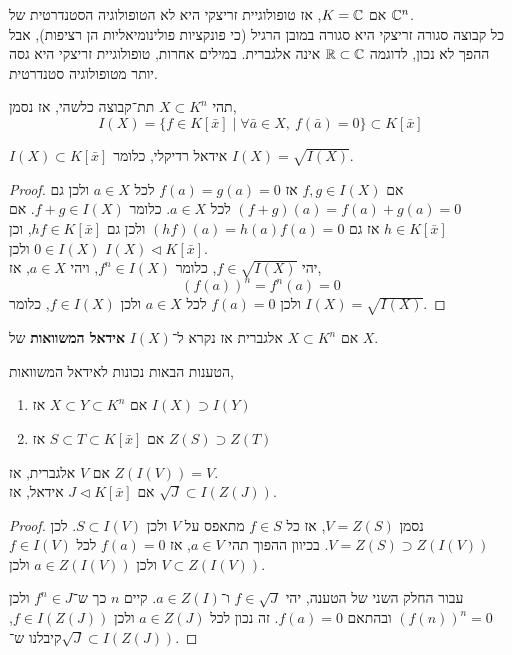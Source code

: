 \begin{remark}
	אם $K = \mathbb{C}$, אז טופולוגיית זריצקי היא לא הטופולוגיה הסטנדרטית של $\mathbb{C}^n$. \\
	כל קבוצה סגורה זריצקי היא סגורה במובן הרגיל (כי פונקציות פולינומיאליות הן רציפות), אבל ההפך לא נכון, לדוגמה $\mathbb{R} \subset \mathbb{C}$ אינה אלגברית.
	במילים אחרות, טופולוגיית זריצקי היא גסה יותר מטופולוגיה סטנדרטית.
\end{remark}
\begin{notation}
	תהי $X \subset K^n$ תת־קבוצה כלשהי, אז נסמן,
	\[
		I(X)
		= \{ f \in K[\bar{x}] \mid \forall \bar{a} \in X,\ f(\bar{a}) = 0 \}
		\subset K[\bar{x}]
	\]
\end{notation}
\begin{proposition}
	$I(X) \subset K[\bar{x}]$ אידאל רדיקלי, כלומר $I(X) = \sqrt{I(X)}$.
\end{proposition}
\begin{proof}
	אם $f, g \in I(X)$ אז $f(a) = g(a) = 0$ לכל $a \in X$ ולכן גם $(f + g)(a) = f(a) + g(a) = 0$ לכל $a \in X$.
	כלומר $f + g \in I(X)$.
	אם $h \in K[\bar{x}]$ אז גם $(h f)(a) = h(a) f(a) = 0$ ולכן גם $h f \in K[\bar{x}]$, וכן $0 \in I(X)$ ולכן $I(X) \triangleleft K[\bar{x}]$. \\
	יהי $f \in \sqrt{I(X)}$, כלומר $f^n \in I(X)$, ויהי $a \in X$, אז,
	\[
		{(f(a))}^n
		= f^n(a)
		= 0
	\]
	ולכן $f(a) = 0$ לכל $a \in X$ ולכן $f \in I(X)$, כלומר $I(X) = \sqrt{I(X)}$.
\end{proof}
אם $X \subset K^n$ אלגברית אז נקרא ל־$I(X)$ \textbf{אידאל המשוואות} של $X$.
\begin{proposition}
	הטענות הבאות נכונות לאידאל המשוואות,
	\begin{enumerate}
		\item אם $X \subset Y \subset K^n$ אז $I(X) \supset I(Y)$
		\item אם $S \subset T \subset K[\bar{x}]$ אז $Z(S) \supset Z(T)$
	\end{enumerate}
\end{proposition}
\begin{proposition}
	אם $V$ אלגברית, אז $Z(I(V)) = V$. \\
	אם $J \triangleleft K[\bar{x}]$ אידאל, אז $\sqrt{J} \subset I(Z(J))$.
\end{proposition}
\begin{proof}
	נסמן $V = Z(S)$, אז כל $f \in S$ מתאפס על $V$ ולכן $S \subset I(V)$.
	לכן $V = Z(S) \supset Z(I(V))$.
	בכיוון ההפוך תהי $a \in V$, אז $f(a) = 0$ לכל $f \in I(V)$ ולכן $a \in Z(I(V))$ ולכן $V \subset Z(I(V))$.

	עבור החלק השני של הטענה, יהי $f \in \sqrt{J}$ ו־$a \in Z(I)$.
	קיים $n$ כך ש־$f^n \in J$ ולכן ${(f(n))}^n = 0$ ובהתאם $f(a) = 0$.
	זה נכון לכל $a \in Z(J)$ ולכן $f \in I(Z(J))$, קיבלנו ש־$\sqrt{J} \subset I(Z(J))$.
\end{proof}
